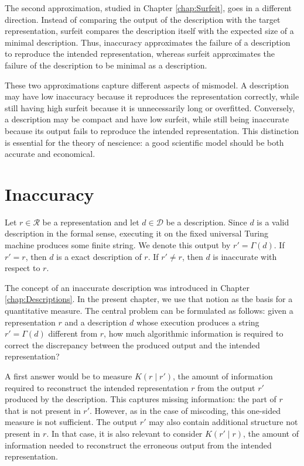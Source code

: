 The second approximation, studied in Chapter \ref{chap:Surfeit}, goes in a different direction. Instead of comparing the output of the description with the target representation, surfeit compares the description itself with the expected size of a minimal description. Thus, inaccuracy approximates the failure of a description to reproduce the intended representation, whereas surfeit approximates the failure of the description to be minimal as a description.

These two approximations capture different aspects of mismodel. A description may have low inaccuracy because it reproduces the representation correctly, while still having high surfeit because it is unnecessarily long or overfitted. Conversely, a description may be compact and have low surfeit, while still being inaccurate because its output fails to reproduce the intended representation. This distinction is essential for the theory of nescience: a good scientific model should be both accurate and economical.


%
%

\section{Inaccuracy}
\label{sec:inaccuracy:inaccuracy}

Let $r \in \mathcal{R}$ be a representation and let $d \in \mathcal D$ be a description. Since $d$ is a valid description in the formal sense, executing it on the fixed universal Turing machine produces some finite string. We denote this output by $r'= \Gamma(d)$. If $r'=r$, then $d$ is a exact description of $r$. If $r'\neq r$, then $d$ is inaccurate with respect to $r$.

The concept of an inaccurate description was introduced in Chapter \ref{chap:Descriptions}. In the present chapter, we use that notion as the basis for a quantitative measure. The central problem can be formulated as follows: given a representation $r$ and a description $d$ whose execution produces a string $r'=\Gamma(d)$ different from $r$, how much algorithmic information is required to correct the discrepancy between the produced output and the intended representation?

A first answer would be to measure $K(r\mid r')$, the amount of information required to reconstruct the intended representation $r$ from the output $r'$ produced by the description. This captures missing information: the part of $r$ that is not present in $r'$. However, as in the case of miscoding, this one-sided measure is not sufficient. The output $r'$ may also contain additional structure not present in $r$. In that case, it is also relevant to consider $K(r'\mid r)$, the amount of information needed to reconstruct the erroneous output from the intended representation.


